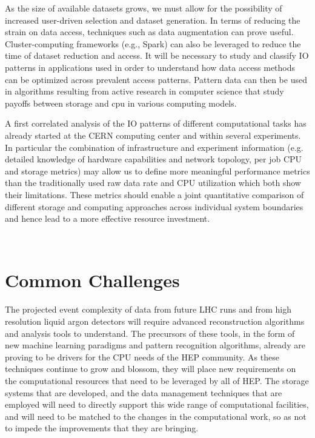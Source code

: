 \documentclass[12pt,a4paper]{article}
\begin{document}
As the size of available datasets grows, we must allow for the
possibility of increased user-driven selection and dataset generation.
In terms of reducing the strain on data access, techniques such as data
augmentation can prove useful. Cluster-computing frameworks (e.g.,
Spark) can also be leveraged to reduce the time of dataset reduction and
access. It will be necessary to study and classify IO patterns in
applications used in order to understand how data access methods can be
optimized across prevalent access patterns. Pattern data can then be
used in algorithms resulting from active research in computer science
that study payoffs between storage and cpu in various computing models.

A first correlated analysis of the IO patterns of different
computational tasks has already started at the CERN computing center and
within several experiments. In particular the combination of
infrastructure and experiment information (e.g. detailed knowledge of
hardware capabilities and network topology, per job CPU and storage
metrics) may allow us to define more meaningful performance metrics than
the traditionally used raw data rate and CPU utilization which both show
their limitations. These metrics should enable a joint quantitative
comparison of different storage and computing approaches across
individual system boundaries and hence lead to a more effective resource
investment.

~

\section{Common Challenges}\label{common-challenges}

The projected event complexity of data from future LHC runs and from
high resolution liquid argon detectors will require advanced
reconstruction algorithms and analysis tools to understand. The
precursors of these tools, in the form of new machine learning paradigms
and pattern recognition algorithms, already are proving to be drivers
for the CPU needs of the HEP community. As these techniques continue to
grow and blossom, they will place new requirements on the computational
resources that need to be leveraged by all of HEP. The storage systems
that are developed, and the data management techniques that are employed
will need to directly support this wide range of computational
facilities, and will need to be matched to the changes in the
computational work, so as not to impede the improvements that they are
bringing.
\end{document}
